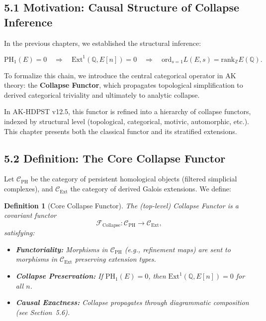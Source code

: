 \documentclass[11pt]{article}
\newtheorem{definition}[theorem]{Definition}
\begin{document}
\subsection{5.1 Motivation: Causal Structure of Collapse Inference}

In the previous chapters, we established the structural inference:

\[
\mathrm{PH}_1(E) = 0 \quad \Rightarrow \quad \mathrm{Ext}^1(\mathbb{Q}, E[n]) = 0 \quad \Rightarrow \quad \mathrm{ord}_{s=1} L(E,s) = \mathrm{rank}_{\mathbb{Z}} E(\mathbb{Q}).
\]

To formalize this chain, we introduce the central categorical operator in AK theory:  
the \textbf{Collapse Functor}, which propagates topological simplification to derived categorical triviality and ultimately to analytic collapse.

In AK-HDPST v12.5, this functor is refined into a hierarchy of collapse functors, indexed by structural level (topological, categorical, motivic, automorphic, etc.). This chapter presents both the classical functor and its stratified extensions.

\subsection{5.2 Definition: The Core Collapse Functor}

Let $\mathcal{C}_{\mathrm{PH}}$ be the category of persistent homological objects (filtered simplicial complexes), and $\mathcal{C}_{\mathrm{Ext}}$ the category of derived Galois extensions.  
We define:

\begin{definition}[Core Collapse Functor]
The (top-level) \emph{Collapse Functor} is a covariant functor
\[
\mathcal{F}_{\mathrm{Collapse}} : \mathcal{C}_{\mathrm{PH}} \longrightarrow \mathcal{C}_{\mathrm{Ext}},
\]
satisfying:
\begin{itemize}
  \item \textbf{Functoriality:} Morphisms in $\mathcal{C}_{\mathrm{PH}}$ (e.g., refinement maps) are sent to morphisms in $\mathcal{C}_{\mathrm{Ext}}$ preserving extension types.
  \item \textbf{Collapse Preservation:} If $\mathrm{PH}_1(E) = 0$, then $\mathrm{Ext}^1(\mathbb{Q}, E[n]) = 0$ for all $n$.
  \item \textbf{Causal Exactness:} Collapse propagates through diagrammatic composition (see Section~5.6).
\end{itemize}
\end{definition}
\end{document}

